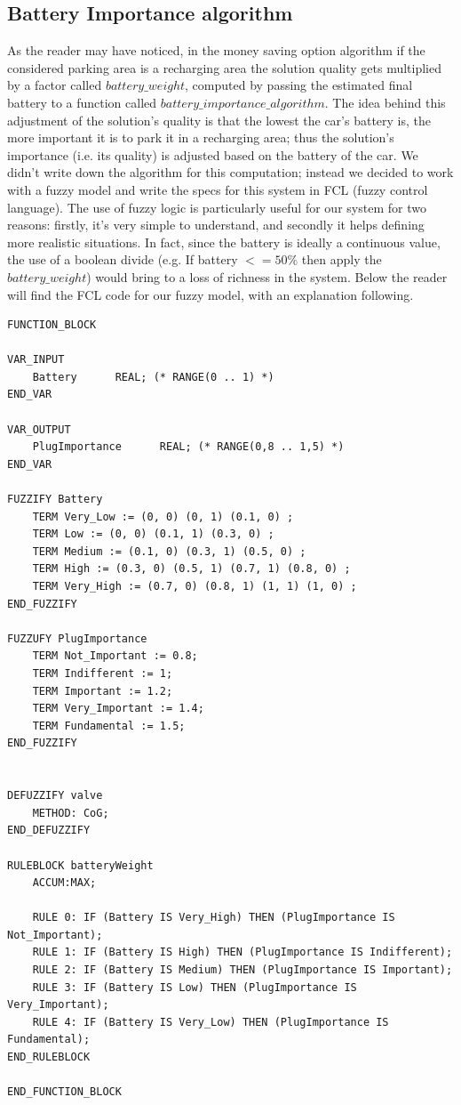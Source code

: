 \subsection{Battery Importance algorithm}
As the reader may have noticed, in the money saving option algorithm if the considered parking area is a recharging area the solution quality gets multiplied by a factor called $battery\_weight$, computed by passing the estimated final battery to a function called $battery\_importance\_algorithm$. 
The idea behind this adjustment of the solution's quality is that the lowest the car's battery is, the more important it is to park it in a recharging area; thus the solution's importance (i.e. its quality) is adjusted based on the battery of the car. 
We didn't write down the algorithm for this computation; instead we decided to work with a fuzzy model and write the specs for this system in FCL (fuzzy control language). The use of fuzzy logic is particularly useful for our system for two reasons: firstly, it's very simple to understand, and secondly it helps defining more realistic situations. In fact, since the battery is ideally a continuous value, the use of a boolean divide (e.g. If battery $<=50\%$ then apply the $battery\_weight$) would bring to a loss of richness in the system.
Below the reader will find the FCL code for our fuzzy model, with an explanation following.


\begin{verbatim}
FUNCTION_BLOCK

VAR_INPUT
    Battery      REAL; (* RANGE(0 .. 1) *) 
END_VAR

VAR_OUTPUT
    PlugImportance      REAL; (* RANGE(0,8 .. 1,5) *) 
END_VAR

FUZZIFY Battery
    TERM Very_Low := (0, 0) (0, 1) (0.1, 0) ;
    TERM Low := (0, 0) (0.1, 1) (0.3, 0) ;
    TERM Medium := (0.1, 0) (0.3, 1) (0.5, 0) ;
    TERM High := (0.3, 0) (0.5, 1) (0.7, 1) (0.8, 0) ;
    TERM Very_High := (0.7, 0) (0.8, 1) (1, 1) (1, 0) ;
END_FUZZIFY

FUZZUFY PlugImportance
    TERM Not_Important := 0.8;
    TERM Indifferent := 1;
    TERM Important := 1.2;
    TERM Very_Important := 1.4;
    TERM Fundamental := 1.5;
END_FUZZIFY


DEFUZZIFY valve 
    METHOD: CoG;
END_DEFUZZIFY

RULEBLOCK batteryWeight
    ACCUM:MAX;

    RULE 0: IF (Battery IS Very_High) THEN (PlugImportance IS Not_Important);
    RULE 1: IF (Battery IS High) THEN (PlugImportance IS Indifferent);
    RULE 2: IF (Battery IS Medium) THEN (PlugImportance IS Important);
    RULE 3: IF (Battery IS Low) THEN (PlugImportance IS Very_Important);
    RULE 4: IF (Battery IS Very_Low) THEN (PlugImportance IS Fundamental);
END_RULEBLOCK

END_FUNCTION_BLOCK
\end{verbatim}

